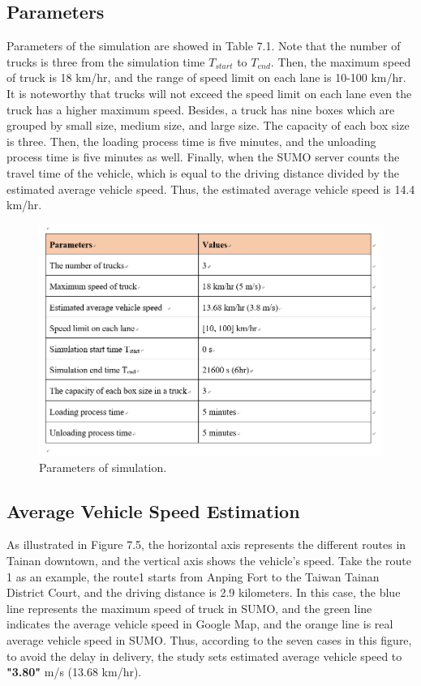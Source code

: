 \documentclass[12pt]{ksthesis}
\begin{document}
\begin{thesis}
{\subsection{Parameters}
Parameters of the simulation are showed in Table 7.1. Note that the number of trucks is three from the simulation time $T_{start}$ to $T_{end}$. 
Then, the maximum speed of truck is 18 km/hr, and the range of speed limit on each lane is 10-100 km/hr. It is noteworthy that trucks will not exceed the speed limit on each lane even the truck has a higher maximum speed. Besides, a truck has nine boxes which are grouped by small size, medium size, and large size. The capacity of each box size is three. Then, the loading process time is five minutes, and the unloading process time is five minutes as well. Finally, when the SUMO server counts the travel time of the vehicle, which is equal to the driving distance divided by the estimated average vehicle speed. Thus, the estimated average vehicle speed is 14.4 km/hr.

\begin{figure}[H]
\centering
\includegraphics[width=1.0\textwidth]{./Thesis_figures/F7-4_parameters.PNG}
\caption{\large Parameters of simulation.}
\vspace{0.5cm}
\label{Fig:Parameters_of_Simulation}
\end{figure}

\subsection{Average Vehicle Speed Estimation}

As illustrated in Figure 7.5, the horizontal axis represents the different routes in Tainan downtown, and the vertical axis shows the vehicle's speed. Take the route 1 as an example, the route1 starts from Anping Fort to the Taiwan Tainan District Court, and the driving distance is 2.9 kilometers. In this case, the blue line represents the maximum speed of truck in SUMO, and the green line indicates the average vehicle speed in Google Map, and the orange line is real average vehicle speed in SUMO. Thus, according to the seven cases in this figure, to avoid the delay in delivery, the study sets estimated average vehicle speed to \textbf{"3.80"} m/s (13.68 km/hr).


}
\end{thesis}
\end{document}
